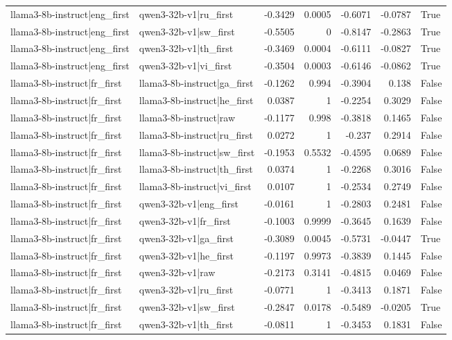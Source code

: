 \begin{table}
\begin{tabular}{l l r r r r l}
llama3-8b-instruct|eng_first & qwen3-32b-v1|ru_first & -0.3429 & 0.0005 & -0.6071 & -0.0787 & True \\
llama3-8b-instruct|eng_first & qwen3-32b-v1|sw_first & -0.5505 & 0 & -0.8147 & -0.2863 & True \\
llama3-8b-instruct|eng_first & qwen3-32b-v1|th_first & -0.3469 & 0.0004 & -0.6111 & -0.0827 & True \\
llama3-8b-instruct|eng_first & qwen3-32b-v1|vi_first & -0.3504 & 0.0003 & -0.6146 & -0.0862 & True \\
llama3-8b-instruct|fr_first & llama3-8b-instruct|ga_first & -0.1262 & 0.994 & -0.3904 & 0.138 & False \\
llama3-8b-instruct|fr_first & llama3-8b-instruct|he_first & 0.0387 & 1 & -0.2254 & 0.3029 & False \\
llama3-8b-instruct|fr_first & llama3-8b-instruct|raw & -0.1177 & 0.998 & -0.3818 & 0.1465 & False \\
llama3-8b-instruct|fr_first & llama3-8b-instruct|ru_first & 0.0272 & 1 & -0.237 & 0.2914 & False \\
llama3-8b-instruct|fr_first & llama3-8b-instruct|sw_first & -0.1953 & 0.5532 & -0.4595 & 0.0689 & False \\
llama3-8b-instruct|fr_first & llama3-8b-instruct|th_first & 0.0374 & 1 & -0.2268 & 0.3016 & False \\
llama3-8b-instruct|fr_first & llama3-8b-instruct|vi_first & 0.0107 & 1 & -0.2534 & 0.2749 & False \\
llama3-8b-instruct|fr_first & qwen3-32b-v1|eng_first & -0.0161 & 1 & -0.2803 & 0.2481 & False \\
llama3-8b-instruct|fr_first & qwen3-32b-v1|fr_first & -0.1003 & 0.9999 & -0.3645 & 0.1639 & False \\
llama3-8b-instruct|fr_first & qwen3-32b-v1|ga_first & -0.3089 & 0.0045 & -0.5731 & -0.0447 & True \\
llama3-8b-instruct|fr_first & qwen3-32b-v1|he_first & -0.1197 & 0.9973 & -0.3839 & 0.1445 & False \\
llama3-8b-instruct|fr_first & qwen3-32b-v1|raw & -0.2173 & 0.3141 & -0.4815 & 0.0469 & False \\
llama3-8b-instruct|fr_first & qwen3-32b-v1|ru_first & -0.0771 & 1 & -0.3413 & 0.1871 & False \\
llama3-8b-instruct|fr_first & qwen3-32b-v1|sw_first & -0.2847 & 0.0178 & -0.5489 & -0.0205 & True \\
llama3-8b-instruct|fr_first & qwen3-32b-v1|th_first & -0.0811 & 1 & -0.3453 & 0.1831 & False \\

\end{tabular}
\end{table}
